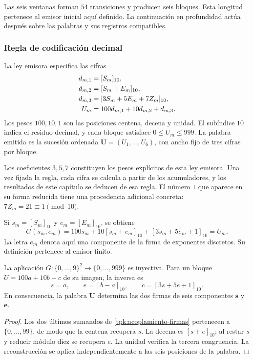 Las seis ventanas forman \(54\) transiciones y producen seis bloques.
Esta longitud pertenece al emisor inicial aquí definido. La continuación
en profundidad actúa después sobre las palabras y sus registros compatibles.

\subsubsection{Regla de codificación decimal}

La ley emisora especifica las cifras
\begin{align}
 d_{m,1}&=[S_m]_{10},\notag\\
 d_{m,2}&=[S_m+E_m]_{10},\notag\\
 d_{m,3}&=[3S_m+5E_m+7Z_m]_{10},\notag\\
 U_m&=100d_{m,1}+10d_{m,2}+d_{m,3}.
 \label{tpk:bloque-decimal}
\end{align}
Los pesos \(100,10,1\) son las posiciones centena, decena y unidad.
El subíndice \(10\) indica el residuo decimal, y cada bloque satisface
\(0\leq U_m\leq999\). La palabra emitida es la sucesión ordenada
\(\mathbf U=(U_1,\ldots,U_6)\), con ancho fijo de tres cifras por bloque.

Los coeficientes \(3,5,7\) constituyen los pesos explícitos de esta ley
emisora. Una vez fijada la regla, cada cifra se calcula a partir de los
acumuladores, y los resultados de este capítulo se deducen de esa regla.
El número \(1\) que aparece en su forma reducida tiene una procedencia
adicional concreta: \(7Z_m=21\equiv1\pmod{10}\).

Si \(s_m=[S_m]_{10}\) y \(e_m=[E_m]_{10}\), se obtiene
\begin{equation}
 G(s_m,e_m)=100s_m+10[s_m+e_m]_{10}
                   +[3s_m+5e_m+1]_{10}=U_m.
 \label{tpk:acoplamiento-firmas}
\end{equation}
La letra \(e_m\) denota aquí una componente de la firma de exponentes
discretos. Su definición pertenece al emisor finito.

\begin{proposicion}
\label{tpk:recuperacion-firmas}
La aplicación \(G:\{0,\ldots,9\}^2\to\{0,\ldots,999\}\) es inyectiva.
Para un bloque \(U=100a+10b+c\) de su imagen, la inversa es
\[
 s=a,\qquad e=[b-a]_{10},\qquad
 c=[3s+5e+1]_{10}.
\]
En consecuencia, la palabra \(\mathbf U\) determina las dos firmas de
seis componentes \(\mathbf s\) y \(\mathbf e\).
\end{proposicion}
\begin{proof}
Los dos últimos sumandos de \eqref{tpk:acoplamiento-firmas} pertenecen a
\(\{0,\ldots,99\}\), de modo que la centena recupera \(s\). La decena
es \([s+e]_{10}\); al restar \(s\) y reducir módulo diez se recupera
\(e\). La unidad verifica la tercera congruencia. La reconstrucción se
aplica independientemente a las seis posiciones de la palabra.
\end{proof}

